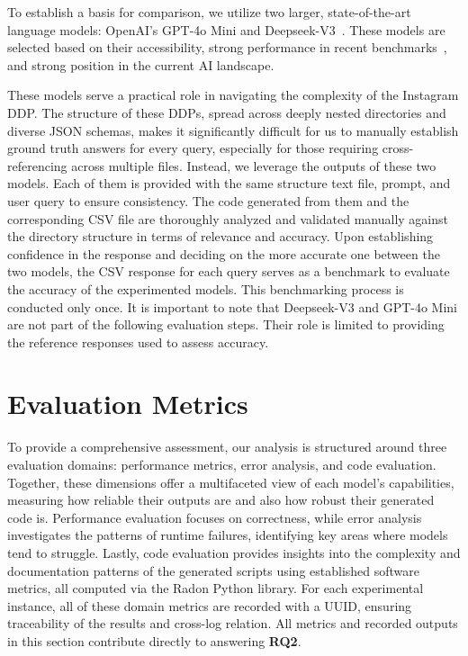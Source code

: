 \documentclass{DESSThesis}
\begin{document}
To establish a basis for comparison, we utilize two larger, state-of-the-art language models: OpenAI's GPT-4o Mini and Deepseek-V3~\cite{deepseekai2025deepseekv3technicalreport}. These models are selected based on their accessibility, strong performance in recent benchmarks~\cite{puspitasari2025deepseek,gao2025comparisondeepseekllms}, and strong position in the current AI landscape. 

These models serve a practical role in navigating the complexity of the Instagram DDP. The structure of these DDPs, spread across deeply nested directories and diverse JSON schemas, makes it significantly difficult for us to manually establish ground truth answers for every query, especially for those requiring cross-referencing across multiple files. Instead, we leverage the outputs of these two models. Each of them is provided with the same structure text file, prompt, and user query to ensure consistency. The code generated from them and the corresponding CSV file are thoroughly analyzed and validated manually against the directory structure in terms of relevance and accuracy. Upon establishing confidence in the response and deciding on the more accurate one between the two models, the CSV response for each query serves as a benchmark to evaluate the accuracy of the experimented models. This benchmarking process is conducted only once. It is important to note that Deepseek-V3 and GPT-4o Mini are not part of the following evaluation steps. Their role is limited to providing the reference responses used to assess accuracy.

\section{Evaluation Metrics} \label{evaluation_metrics}

To provide a comprehensive assessment, our analysis is structured around three evaluation domains: performance metrics, error analysis, and code evaluation. Together, these dimensions offer a multifaceted view of each model's capabilities, measuring how reliable their outputs are and also how robust their generated code is. Performance evaluation focuses on correctness, while error analysis investigates the patterns of runtime failures, identifying key areas where models tend to struggle. Lastly, code evaluation provides insights into the complexity and documentation patterns of the generated scripts using established software metrics, all computed via the Radon Python library. For each experimental instance, all of these domain metrics are recorded with a UUID, ensuring traceability of the results and cross-log relation. All metrics and recorded outputs in this section contribute directly to answering \textbf{RQ2}.
\end{document}
